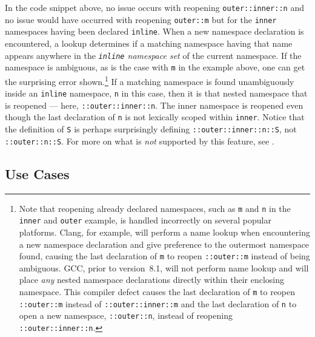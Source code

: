 \noindent In the code snippet above, no issue occurs with reopening
\lstinline!outer::inner::n! and no issue would have occurred with reopening
\lstinline!outer::m! but for the \lstinline!inner! namespaces having been
declared \lstinline!inline!. When a new namespace declaration is
encountered, a lookup determines if a matching namespace having that
name appears anywhere in the \emph{\lstinline!inline! namespace set} of the
current namespace. If the namespace is ambiguous, as is the case with
\lstinline!m! in the example above, one can get the surprising error shown.{\cprotect\footnote{Note that reopening already declared
namespaces, such as \lstinline!m! and \lstinline!n! in the \lstinline!inner!
and \lstinline!outer! example, is handled incorrectly on several
popular platforms. Clang, for example, will perform a name lookup when
encountering a new namespace declaration and give preference to the
outermost namespace found, causing the last declaration of \lstinline!m!
to reopen \lstinline!::outer::m! instead of being ambiguous. GCC, prior
to version~8.1, will not perform name lookup and will place \emph{any}
nested namespace declarations directly within their enclosing
namespace. This compiler defect causes the last declaration of
\lstinline!m! to reopen \lstinline!::outer::m! instead of
\lstinline!::outer::inner::m! and the last declaration of \lstinline!n! to
open a new namespace, \lstinline!::outer::n!, instead of reopening
  \lstinline!::outer::inner::n!.}} If a matching namespace is found
unambiguously inside an \lstinline!inline! namespace, \lstinline!n! in this
case, then it is that nested namespace that is reopened --- here,
\lstinline!::outer::inner::n!. The inner namespace is reopened even though
the last declaration of \lstinline!n! is not lexically scoped within
\lstinline!inner!. Notice that the definition of \lstinline!S! is perhaps
surprisingly defining \lstinline!::outer::inner::n::S!, not
\lstinline!::outer::n::S!. For more on what is \emph{not} supported by this
feature, see . 

\subsection[Use Cases]{Use Cases}\label{use-cases-inlinenamespace}

